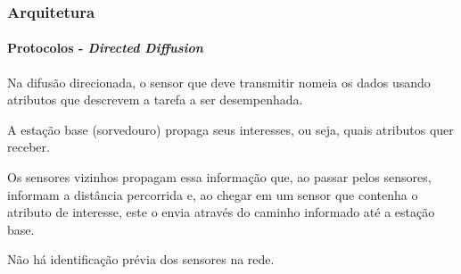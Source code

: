 \documentclass[notes]{beamer}
\begin{document}
\begin{frame}
\frametitle{Arquitetura}
\framesubtitle{Protocolos - \textit{Directed Diffusion}}

\begin{block}

Na difusão direcionada, o sensor que deve transmitir nomeia os dados usando atributos que descrevem a tarefa a ser desempenhada.

\end{block} \pause

\begin{block}

A estação base (sorvedouro) propaga seus interesses, ou seja, quais atributos quer receber. 
\end{block} \pause

\begin{block}

Os sensores vizinhos propagam essa informação que, ao passar pelos sensores, informam a distância percorrida e, ao chegar em um sensor que contenha o atributo de interesse, este o envia através do caminho informado até a estação base.

\end{block} \pause

\begin{block}

Não há identificação prévia dos sensores na rede. 

\end{block} 

\end{frame}
\end{document}
